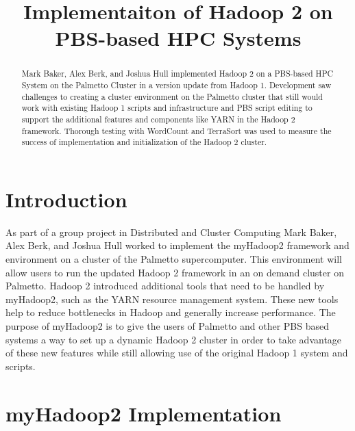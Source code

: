 \documentclass[conference]{IEEEtran}
\begin{document}
	\title{Implementaiton of Hadoop 2 on PBS-based HPC Systems}

	\author{
	}

	\maketitle

	\begin{abstract}
		Mark Baker, Alex Berk, and Joshua Hull implemented Hadoop 2 on a PBS-based HPC System on the Palmetto Cluster in a version update from Hadoop 1.  Development saw challenges to creating a cluster environment on the Palmetto cluster that still would work with existing Hadoop 1 scripts and infrastructure and PBS script editing to support the additional features and components like YARN in the Hadoop 2 framework.  Thorough testing with WordCount and TerraSort was used to measure the success of implementation and initialization of the Hadoop 2 cluster.
	\end{abstract}

	\section{Introduction}
		As part of a group project in Distributed and Cluster Computing Mark Baker, Alex Berk, and Joshua Hull worked to implement the myHadoop2 framework and environment on a cluster of the Palmetto supercomputer. This environment will allow users to run the updated Hadoop 2 framework in an on demand cluster on Palmetto. Hadoop 2 introduced additional tools that need to be handled by myHadoop2, such as the YARN resource management system.  These new tools help to reduce bottlenecks in Hadoop and generally increase performance. The purpose of myHadoop2 is to give the users of Palmetto and other PBS based systems a way to set up a dynamic Hadoop 2 cluster in order to take advantage of these new features while still allowing use of the original Hadoop 1 system and scripts.

	\section{myHadoop2 Implementation}
\end{document}
